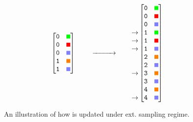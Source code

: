 \begin{figure}[h]
  \centering
\[
\begin{bmatrix}
\py{0} & \tikz\fill[green] (0,0) rectangle (0.2,0.2); \\
\py{0} & \tikz\fill[red] (0,0) rectangle (0.2,0.2); \\
\py{0} & \tikz\fill[fill=blue!50] (0,0) rectangle (0.2,0.2); \\
\py{1} & \tikz\fill[orange] (0,0) rectangle (0.2,0.2); \\
\py{1} & \tikz\fill[fill=blue!50] (0,0) rectangle (0.2,0.2); 
\end{bmatrix}
\;
\qquad
\xrightarrow{\hspace{1cm}}
\qquad
\begin{matrix}
 \\
 \\
 \\
\rightarrow \\
\rightarrow \\
\rightarrow \\
\\
\\
\rightarrow \\
\\
\\
\rightarrow \\
\end{matrix}
\begin{bmatrix}
\py{0} & \tikz\fill[green] (0,0) rectangle (0.2,0.2); \\
\py{0} & \tikz\fill[red] (0,0) rectangle (0.2,0.2); \\
\py{0} & \tikz\fill[fill=blue!50] (0,0) rectangle (0.2,0.2); \\
\py{1} & \tikz\fill[green] (0,0) rectangle (0.2,0.2); \\
\py{1} & \tikz\fill[red] (0,0) rectangle (0.2,0.2); \\
\py{1} & \tikz\fill[fill=blue!50] (0,0) rectangle (0.2,0.2); \\
\py{2} & \tikz\fill[orange] (0,0) rectangle (0.2,0.2); \\
\py{2} & \tikz\fill[fill=blue!50] (0,0) rectangle (0.2,0.2); \\
\py{3} & \tikz\fill[orange] (0,0) rectangle (0.2,0.2); \\
\py{3} & \tikz\fill[fill=blue!50] (0,0) rectangle (0.2,0.2); \\
\py{4} & \tikz\fill[orange] (0,0) rectangle (0.2,0.2); \\
\py{4} & \tikz\fill[fill=blue!50] (0,0) rectangle (0.2,0.2);
\end{bmatrix}
\]
  \caption{An illustration of how  is updated under ext. sampling regime.}
  \label{fig:tsid}
\end{figure}